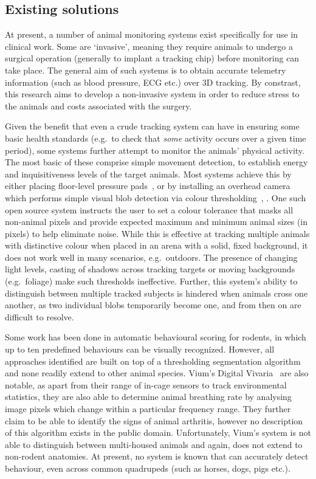     \subsection{Existing solutions}
    At present, a number of animal monitoring systems exist specifically for use in clinical work. Some are `invasive', meaning they require animals to undergo a surgical operation (generally to implant a tracking chip) before monitoring can take place. The general aim of such systems is to obtain accurate telemetry information (such as blood pressure, ECG etc.) over 3D tracking. By constrast, this research aims to develop a non-invasive system in order to reduce stress to the animals and costs associated with the surgery.

    Given the benefit that even a crude tracking system can have in ensuring some basic health standards (e.g.\ to check that \emph{some} activity occurs over a given time period), some systems further attempt to monitor the animals' physical activity. The most basic of these comprise simple movement detection, to establish energy and inquisitiveness levels of the target animals. Most systems achieve this by either placing floor-level pressure pads~\cite{zammit2010reliability}, or by installing an overhead camera which performs simple visual blob detection via colour thresholding~\cite{tort2006simple}, \cite{rodriquez2017toxtrac}. One such open source system instructs the user to set a colour tolerance that masks all non-animal pixels and provide expected maximum and minimum animal sizes (in pixels) to help eliminate noise. While this is effective at tracking multiple animals with distinctive colour when placed in an arena with a solid, fixed background, it does not work well in many scenarios, e.g.\ outdoors. The presence of changing light levels, casting of shadows across tracking targets or moving backgrounds (e.g.\ foliage) make such thresholds ineffective. Further, this system's ability to distinguish between multiple tracked subjects is hindered when animals cross one another, as two individual blobs temporarily become one, and from then on are difficult to resolve.

    Some work has been done in automatic behavioural scoring for rodents, in which up to ten predefined behaviours can be visually recognized. However, all approaches identified are built on top of a thresholding segmentation algorithm and none readily extend to other animal species. Vium's Digital Vivaria~\cite{vium_inc} are also notable, as apart from their range of in-cage sensors to track environmental statistics, they are also able to determine animal breathing rate by analysing image pixels which change within a particular frequency range. They further claim to be able to identify the signs of animal arthritis, however no description of this algorithm exists in the public domain. Unfortunately, Vium's system is not able to distinguish between multi-housed animals and again, does not extend to non-rodent anatomies. At present, no system is known that can accurately detect behaviour, even across common quadrupeds (such as horses, dogs, pigs etc.).


